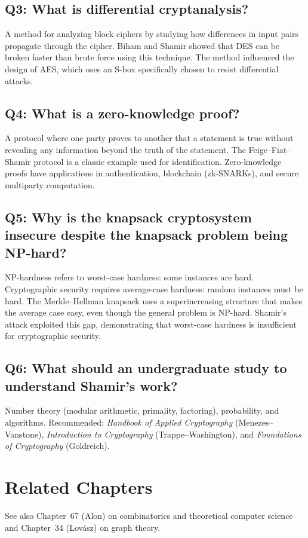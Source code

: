 \subsection*{Q3: What is differential cryptanalysis?}
A method for analyzing block ciphers by studying how differences in input pairs propagate through the cipher. Biham and Shamir showed that DES can be broken faster than brute force using this technique. The method influenced the design of AES, which uses an S-box specifically chosen to resist differential attacks.

\subsection*{Q4: What is a zero-knowledge proof?}
A protocol where one party proves to another that a statement is true without revealing any information beyond the truth of the statement. The Feige--Fiat--Shamir protocol is a classic example used for identification. Zero-knowledge proofs have applications in authentication, blockchain (zk-SNARKs), and secure multiparty computation.

\subsection*{Q5: Why is the knapsack cryptosystem insecure despite the knapsack problem being NP-hard?}
NP-hardness refers to worst-case hardness: some instances are hard. Cryptographic security requires average-case hardness: random instances must be hard. The Merkle--Hellman knapsack uses a superincreasing structure that makes the average case easy, even though the general problem is NP-hard. Shamir's attack exploited this gap, demonstrating that worst-case hardness is insufficient for cryptographic security.

\subsection*{Q6: What should an undergraduate study to understand Shamir's work?}
Number theory (modular arithmetic, primality, factoring), probability, and algorithms. Recommended: \textit{Handbook of Applied Cryptography} (Menezes--Vanstone), \textit{Introduction to Cryptography} (Trappe--Washington), and \textit{Foundations of Cryptography} (Goldreich).

\section{Related Chapters}
See also Chapter~67 (Alon) on combinatorics and theoretical computer science and Chapter~34 (Lovász) on graph theory.

